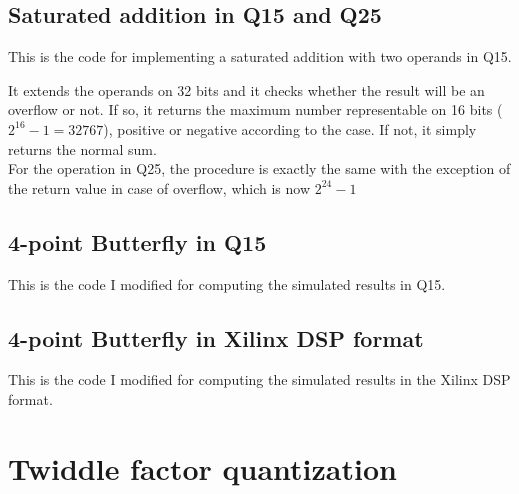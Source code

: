 \documentclass[paper=a4, fontsize=12pt]{scrartcl} %
\numberwithin{equation}{section} %
\numberwithin{figure}{section} %
\numberwithin{table}{section} %
\begin{document}
\subsection{Saturated addition in Q15 and Q25}

This is the code for implementing a saturated addition with two operands in Q15.



It extends the operands on 32 bits and it checks whether the result will be an
overflow or not. If so, it returns the maximum number representable on 16 bits
($2^{16}-1 = 32767$), positive or negative according to the case. If not, it simply
returns the normal sum.\\

For the operation in Q25, the procedure is exactly the same with the exception
of the return value in case of overflow, which is now $2^{24}-1$



\subsection{4-point Butterfly in Q15}
This is the code I modified for computing the simulated results in Q15.


\subsection{4-point Butterfly in Xilinx DSP format}
This is the code I modified for computing the simulated results in the Xilinx DSP format.


\section{Twiddle factor quantization}
\end{document}
